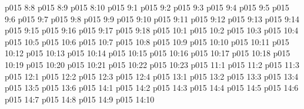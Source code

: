 \vs p015 8:8 
\vs p015 8:9 
\vs p015 8:10 
\vs p015 9:1 
\vs p015 9:2 
\vs p015 9:3 \pc 
\vs p015 9:4 
\vs p015 9:5 
\vs p015 9:6 
\vs p015 9:7 
\vs p015 9:8 
\vs p015 9:9 
\vs p015 9:10 
\vs p015 9:11 \pc 
\vs p015 9:12 
\vs p015 9:13 
\vs p015 9:14 
\vs p015 9:15 \pc 
\vs p015 9:16 
\vs p015 9:17 
\vs p015 9:18 \pc 
{}
\vs p015 10:1 
\vs p015 10:2 
\vs p015 10:3 \pc 
\vs p015 10:4 
\vs p015 10:5 
\vs p015 10:6 
\vs p015 10:7 
\vs p015 10:8 
\vs p015 10:9 
\vs p015 10:10 
\vs p015 10:11 \pc 
\vs p015 10:12 
\vs p015 10:13 
\vs p015 10:14 
\vs p015 10:15 
\vs p015 10:16 
\vs p015 10:17 
\vs p015 10:18 
\vs p015 10:19 
\vs p015 10:20 
\vs p015 10:21 \pc 
\vs p015 10:22 \pc 
\vs p015 10:23 
\vs p015 11:1 
\vs p015 11:2 
\vs p015 11:3 
\vs p015 12:1 
\vs p015 12:2 
\vs p015 12:3 
\vs p015 12:4 
\vs p015 13:1 
\vs p015 13:2 
\vs p015 13:3 
\vs p015 13:4 \pc 
\vs p015 13:5 
\vs p015 13:6 
\vs p015 14:1 
\vs p015 14:2 
\vs p015 14:3 
\vs p015 14:4 
\vs p015 14:5 \pc 
\vs p015 14:6 
\vs p015 14:7 
\vs p015 14:8 
\vs p015 14:9 \pc 
\vsetoff
\vs p015 14:10 
\quizlink
